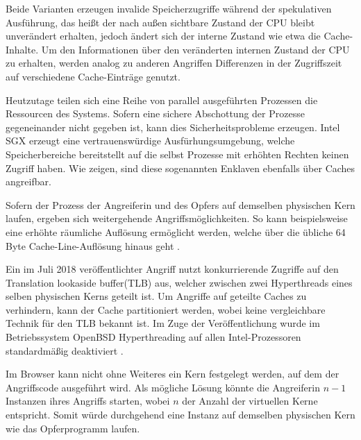 Beide Varianten erzeugen invalide Speicherzugriffe während der spekulativen Ausführung, das heißt der nach außen sichtbare Zustand der CPU bleibt unverändert erhalten, jedoch ändert sich der interne Zustand wie etwa die Cache-Inhalte.
Um den Informationen über den veränderten internen Zustand der CPU zu erhalten, werden analog zu anderen Angriffen Differenzen in der Zugriffszeit auf verschiedene Cache-Einträge genutzt.

Heutzutage teilen sich eine Reihe von parallel ausgeführten Prozessen die Ressourcen des Systems.
Sofern eine sichere Abschottung der Prozesse gegeneinander nicht gegeben ist, kann dies Sicherheitsprobleme erzeugen.
Intel SGX erzeugt eine vertrauenswürdige Ausfürhungsumgebung, welche Speicherbereiche bereitstellt auf die selbst Prozesse mit erhöhten Rechten keinen Zugriff haben.
Wie \cite{CacheZoom,CacheAttacksIntelSGX} zeigen, sind diese sogenannten Enklaven ebenfalls über Caches angreifbar.

Sofern der Prozess der Angreiferin und des Opfers auf demselben physischen Kern laufen, ergeben sich weitergehende Angriffsmöglichkeiten.
So kann beispielsweise eine erhöhte räumliche Auflösung ermöglicht werden, welche über die übliche 64 Byte Cache-Line-Auflösung hinaus geht \cite{MemJam}.

Ein im Juli 2018 veröffentlichter Angriff \cite{TLBleed} nutzt konkurrierende Zugriffe auf den Translation lookaside buffer(TLB) aus, welcher zwischen zwei Hyperthreads eines selben physischen Kerns geteilt ist.
Um Angriffe auf geteilte Caches zu verhindern, kann der Cache partitioniert werden, wobei keine vergleichbare Technik für den TLB bekannt ist.
Im Zuge der Veröffentlichung wurde im Betriebssystem OpenBSD Hyperthreading auf allen Intel-Prozessoren standardmäßig deaktiviert \cite{OpenBSDHyperthreading}.

Im Browser kann nicht ohne Weiteres ein Kern festgelegt werden, auf dem der Angriffscode ausgeführt wird.
Als mögliche Lösung könnte die Angreiferin $n-1$ Instanzen ihres Angriffs starten, wobei $n$ der Anzahl der virtuellen Kerne entspricht.
Somit würde durchgehend eine Instanz auf demselben physischen Kern wie das Opferprogramm laufen.